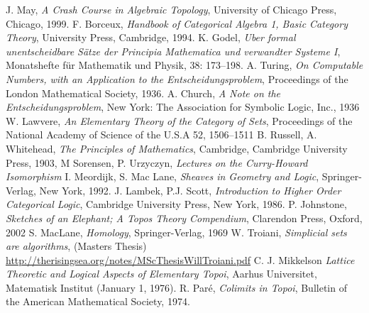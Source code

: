 \documentclass{tac}
\begin{document}
		 J. May, \emph{A Crash Course in Algebraic Topology}, University of Chicago Press, Chicago, 1999.
		 F. Borceux, \emph{Handbook of Categorical Algebra 1, Basic Category Theory}, University Press, Cambridge, 1994.
		 K. Godel, \emph{Uber formal unentscheidbare Sätze der Principia Mathematica und verwandter Systeme I}, Monatshefte für Mathematik und Physik, 38: 173–198.
		 A. Turing, \emph{On Computable Numbers, with an Application to the Entscheidungsproblem}, Proceedings of the London Mathematical Society, 1936.
		 A. Church, \emph{A Note on the Entscheidungsproblem}, New York: The Association for Symbolic Logic, Inc., 1936
		 W. Lawvere, \emph{An Elementary Theory of the Category of Sets}, Proceedings of
		the National Academy of Science of the U.S.A 52, 1506–1511
		 B. Russell, A. Whitehead, \emph{The Principles of Mathematics}, Cambridge, Cambridge University Press, 1903,
		 M Sorensen, P. Urzyczyn, \emph{Lectures on the Curry-Howard Isomorphism}
		 I. Meordijk, S. Mac Lane, \emph{Sheaves in Geometry and Logic}, Springer-Verlag, New York, 1992.
		 J. Lambek, P.J. Scott, \emph{Introduction to Higher Order Categorical Logic}, Cambridge University Press, New York, 1986.
		 P. Johnstone, \emph{Sketches of an Elephant; A Topos Theory Compendium}, Clarendon Press, Oxford, 2002
		 S. MacLane, \emph{Homology}, Springer-Verlag, 1969
		 W. Troiani, \emph{Simplicial sets are algorithms}, (Masters Thesis) \url{http://therisingsea.org/notes/MScThesisWillTroiani.pdf}
		 C. J. Mikkelson \emph{Lattice Theoretic and Logical Aspects of Elementary Topoi}, Aarhus Universitet, Matematisk Institut (January 1, 1976).
		 R. Paré, \emph{Colimits in Topoi}, Bulletin of the American Mathematical Society, 1974.
		
	\endrefs
\end{document}
